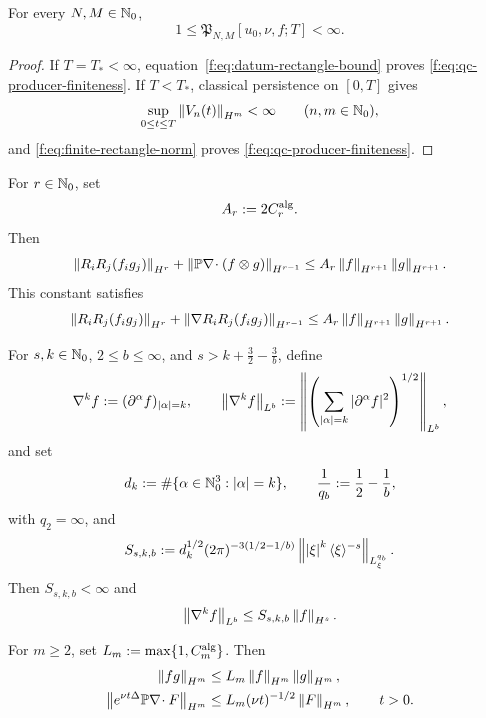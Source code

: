 \begin{lemma}
\label{f:lem:qc-producer-finiteness}
For every \(N,M\in\mathbb N_0\),
\begin{equation}
 1\le \mathfrak P_{N,M}[u_0,\nu,f;T]<\infty.
 \label{f:eq:qc-producer-finiteness}
\end{equation}
\end{lemma}

\begin{proof}
If \(T=T_*<\infty\), equation~\eqref{f:eq:datum-rectangle-bound} proves
\eqref{f:eq:qc-producer-finiteness}.  If \(T<T_*\), classical persistence on
\([0,T]\) gives
\[
 \sup_{0\le t\le T}\left\lVert V_n(t)\right\rVert_{H^m}<\infty
 \qquad(n,m\in\mathbb N_0),
\]
and \eqref{f:eq:finite-rectangle-norm} proves
\eqref{f:eq:qc-producer-finiteness}.
\end{proof}

\begin{lemma}
\label{f:lem:qc-analytic-constants}
For \(r\in\mathbb N_0\), set
\[
 A_r:=2C_r^{\rm alg}.
\]
Then
\begin{equation}
 \left\lVert R_iR_j(f_i g_j)\right\rVert_{H^r}
 +\left\lVert \mathbb P\nabla\!\cdot(f\otimes g)\right\rVert_{H^{r-1}}
 \le A_r\left\lVert f\right\rVert_{H^{r+1}}\left\lVert g\right\rVert_{H^{r+1}}.
 \label{f:eq:qc-product-constant}
\end{equation}
This constant satisfies
\begin{equation}
 \left\lVert R_iR_j(f_i g_j)\right\rVert_{H^r}
 +\left\lVert \nabla R_iR_j(f_i g_j)\right\rVert_{H^{r-1}}
 \le A_r\left\lVert f\right\rVert_{H^{r+1}}\left\lVert g\right\rVert_{H^{r+1}}.
 \label{f:eq:qc-pressure-product-constant}
\end{equation}
\begin{samepage}
For \(s,k\in\mathbb N_0\), \(2\le b\le\infty\), and
\(s>k+\frac32-\frac3b\), define
\[
 \nabla^k f:=(\partial^\alpha f)_{|\alpha|=k},
 \qquad
 \left\lVert \nabla^k f\right\rVert_{L^b}
 :=\left\|\left(
   \sum_{|\alpha|=k}|\partial^\alpha f|^2
 \right)^{1/2}\right\|_{L^b},
\]
and set
\[
 d_k:=\#\{\alpha\in\mathbb N_0^3:\left|\alpha\right|=k\},
 \qquad
 \frac1{q_b}:=\frac12-\frac1b,
\]
with \(q_2=\infty\), and
\begin{equation}
 S_{s,k,b}:=
 d_k^{1/2}(2\pi)^{-3(1/2-1/b)}
 \left\lVert \left|\xi\right|^k\langle\xi\rangle^{-s}\right\rVert_{L^{q_b}_\xi}.
 \label{f:eq:qc-embedding-constant-definition}
\end{equation}
Then \(S_{s,k,b}<\infty\) and
\begin{equation}
 \left\lVert \nabla^k f\right\rVert_{L^b}\le S_{s,k,b}\left\lVert f\right\rVert_{H^s}.
 \label{f:eq:qc-embedding-constant}
\end{equation}
\par
\end{samepage}
For \(m\ge2\), set \(L_m:=\max\{1,C_m^{\rm alg}\}\).  Then
\begin{align}
 \left\lVert fg\right\rVert_{H^m}
 &\le L_m\left\lVert f\right\rVert_{H^m}\left\lVert g\right\rVert_{H^m},
 \label{f:eq:qc-algebra-constant}\\
 \left\lVert e^{\nu t\Delta}\mathbb P\nabla\!\cdot F\right\rVert_{H^m}
 &\le L_m(\nu t)^{-1/2}\left\lVert F\right\rVert_{H^m},
 \qquad t>0.
 \label{f:eq:qc-heat-constant}
\end{align}
\end{lemma}

